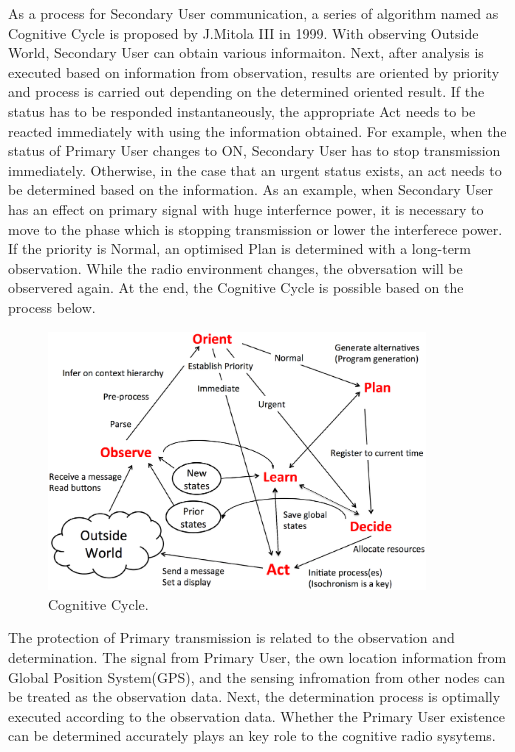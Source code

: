 As a process for Secondary User communication, a series of algorithm named as Cognitive Cycle\cite{ref:mitola} is proposed by J.Mitola I\hspace{-.1em}I\hspace{-.1em}I in 1999. With observing Outside World, Secondary User can obtain various informaiton. Next, after analysis is executed based on information from observation, results are oriented by priority and process is carried out depending on the determined oriented result. If the status has to be responded instantaneously, the appropriate Act needs to be reacted immediately with using the information obtained. For example, when the status of Primary User changes to ON, Secondary User has to stop transmission immediately. Otherwise, in the case that an urgent status exists, an act needs to be determined based on the information. As an example, when Secondary User has an effect on primary signal with huge interfernce power, it is necessary to move to the phase which is stopping transmission or lower the interferece power. If the priority is Normal, an optimised Plan is determined with a long-term observation. While the radio environment changes, the obversation will be observered again. At the end, the Cognitive Cycle is possible based on the process below.
\begin{figure}[!htp]
\begin{center}
\includegraphics[width=100mm,clip]{cognitive_cycle.eps}
\caption{Cognitive Cycle.}
\label{fig:cognitive cycle}
\end{center}
\end{figure}

The protection of Primary transmission is related to the observation and determination. The signal from Primary User, the own location information from Global Position System(GPS), and the sensing infromation from other nodes can be treated as the observation data. Next, the determination process is optimally executed according to the observation data. Whether the Primary User existence can be determined accurately plays an key role to the cognitive radio sysytems.


